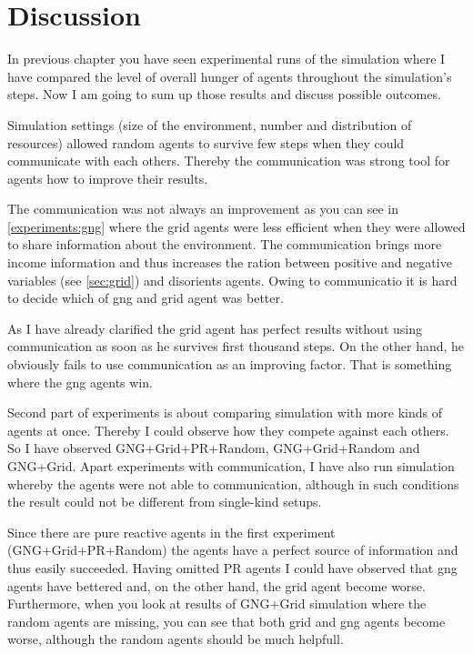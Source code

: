 \chapter{Discussion}

In previous chapter you have seen experimental runs of the simulation where I have compared the level of overall hunger of agents throughout the simulation's steps. Now I am going to sum up those results and discuss possible outcomes.


Simulation settings (size of the environment, number and distribution of resources) allowed random agents to survive few steps when they could communicate with each others. Thereby the communication was strong tool for agents how to improve their results.

The communication was not always an improvement as you can see in \ref{experiments:gng} where the grid agents were less efficient when they were allowed to share information about the environment. The communication brings more income information and thus increases the ration between positive and negative variables (see \ref{sec:grid}) and disorients agents. Owing to communicatio it is hard to decide which of gng and grid agent was better.

As I have already clarified the grid agent has perfect results without using communication as soon as he survives first thousand steps. On the other hand, he obviously fails to use communication as an improving factor. That is something where the gng agents win.


Second part of experiments is about comparing simulation with more kinds of agents at once. Thereby I could observe how they compete against each others. So I have observed GNG+Grid+PR+Random, GNG+Grid+Random and GNG+Grid. Apart experiments with communication, I have also run simulation whereby the agents were not able to communication, although in such conditions the result could not be different from single-kind setups.

Since there are pure reactive agents in the first experiment (GNG+Grid+PR+Random) the agents have a perfect source of information and thus easily succeeded. Having omitted PR agents I could have observed that gng agents have bettered and, on the other hand, the grid agent become worse. Furthermore, when you look at results of GNG+Grid simulation where the random agents are missing, you can see that both grid and gng agents become worse, although the random agents should be much helpfull. 

